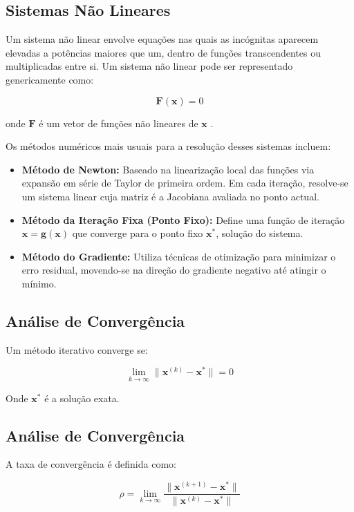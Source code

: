 \documentclass[12pt,a4paper]{article}
\begin{document}
\subsection{Sistemas Não Lineares}

Um sistema não linear envolve equações nas quais as incógnitas aparecem elevadas a potências maiores que um, dentro de funções transcendentes ou multiplicadas entre si. Um sistema não linear pode ser representado genericamente como:

\[
\mathbf{F}(\mathbf{x}) = 0
\]

onde $\mathbf{F}$ é um vetor de funções não lineares de $\mathbf{x}$ \citep{AGUIRRE2023}.

Os métodos numéricos mais usuais para a resolução desses sistemas incluem:

\begin{itemize}
    \item \textbf{Método de Newton:} Baseado na linearização local das funções via expansão em série de Taylor de primeira ordem. Em cada iteração, resolve-se um sistema linear cuja matriz é a Jacobiana avaliada no ponto actual.
    \item \textbf{Método da Iteração Fixa (Ponto Fixo):} Define uma função de iteração $\mathbf{x} = \mathbf{g}(\mathbf{x})$ que converge para o ponto fixo $\mathbf{x}^*$, solução do sistema.
    \item \textbf{Método do Gradiente:} Utiliza técnicas de otimização para minimizar o erro residual, movendo-se na direção do gradiente negativo até atingir o mínimo.
\end{itemize}

\subsection{Análise de Convergência}

Um método iterativo converge se:

$$
\lim_{k \to \infty} \|\mathbf{x}^{(k)} - \mathbf{x}^*\| = 0
$$

Onde $\mathbf{x}^*$ é a solução exata.

\subsection{Análise de Convergência}

A taxa de convergência é definida como:

$$
\rho = \lim_{k \to \infty} \frac{\|\mathbf{x}^{(k+1)} - \mathbf{x}^*\|}{\|\mathbf{x}^{(k)} - \mathbf{x}^*\|}
$$
\end{document}
